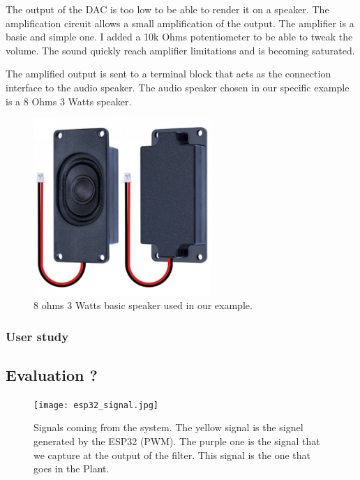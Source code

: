 The output of the DAC is too low to be able to render it on a speaker. The amplification circuit allows a small
amplification of the output. The amplifier is a basic and simple one. I added a 10k Ohms potentiometer to be able to
tweak the volume. The sound quickly reach amplifier limitations and is becoming saturated.

The amplified output is sent to a terminal block that acts as the connection interface to the audio speaker.
The audio speaker chosen in our specific example is a 8 Ohms 3 Watts speaker.

\begin{figure}[h!]
    \centering
    \includegraphics[width=0.6\textwidth]{images/speaker.jpg}
    \caption{8 ohms 3 Watts basic speaker used in our example.}
    \vspace{0.1cm}
    \label{fig:speaker}
\end{figure}


\newpage
\subsubsection{User study}

\subsection{Evaluation ?}

\begin{figure}[h!]
    \centering
    \texttt{[image: esp32\_signal.jpg]}
    \caption{Signals coming from the system. The yellow signal is the signel generated by the ESP32 (PWM). The purple one is the signal that we capture at the output of the filter. This signal is the one that goes in the Plant.}
    \vspace{0.1cm}
    \label{fig:esp_32_signal}
\end{figure}



